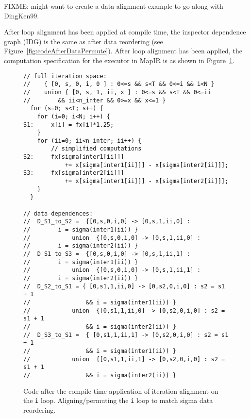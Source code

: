 \documentclass{article}
\begin{document}
FIXME: might want to create a data alignment example to go along with DingKen99.

After loop alignment has been applied at compile time, the inspector dependence graph (IDG) is the same as after data reordering (see Figure~\ref{fig:codeAfterDataPermute}).
After loop alignment has been applied, the computation specification for the executor in MapIR is as shown
in Figure~\ref{fig:codeAfterLA}.

\begin{figure}[h!t!]
\begin{verbatim}
// full iteration space:
//    { [0, s, 0, i, 0 ] : 0<=s && s<T && 0<=i && i<N }
//    union { [0, s, 1, ii, x ] : 0<=s && s<T && 0<=ii 
//        && ii<n_inter && 0>=x && x<=1 }
  for (s=0; s<T; s++) {
    for (i=0; i<N; i++) {
S1:     x[i] = fx[i]*1.25;
    }
    for (ii=0; ii<n_inter; ii++) {
        // simplified computations
S2:     fx[sigma[inter1[ii]]] 
            += x[sigma[inter1[ii]]] - x[sigma[inter2[ii]]]; 
S3:     fx[sigma[inter2[ii]]] 
            += x[sigma[inter1[ii]]] - x[sigma[inter2[ii]]]; 
    }
  }
  
// data dependences:
//  D_S1_to_S2 =  {[0,s,0,i,0] -> [0,s,1,ii,0] : 
//        i = sigma(inter1(ii)) }
//            union  {[0,s,0,i,0] -> [0,s,1,ii,0] : 
//        i = sigma(inter2(ii)) }
//  D_S1_to_S3 =  {[0,s,0,i,0] -> [0,s,1,ii,1] : 
//        i = sigma(inter1(ii)) }
//            union  {[0,s,0,i,0] -> [0,s,1,ii,1] : 
//        i = sigma(inter2(ii)) }
//  D_S2_to_S1 = { [0,s1,1,ii,0] -> [0,s2,0,i,0] : s2 = s1 + 1 
//                && i = sigma(inter1(ii)) }
//            union  {[0,s1,1,ii,0] -> [0,s2,0,i,0] : s2 = s1 + 1 
//                && i = sigma(inter2(ii)) }
//  D_S3_to_S1 =  { [0,s1,1,ii,1] -> [0,s2,0,i,0] : s2 = s1 + 1 
//                && i = sigma(inter1(ii)) }
//            union  {[0,s1,1,ii,1] -> [0,s2,0,i,0] : s2 = s1 + 1 
//                && i = sigma(inter2(ii)) }

\end{verbatim}
\caption{Code after the compile-time application of iteration alignment on the
{\tt i} loop.  Aligning/permuting the {\tt i} loop to match sigma data reordering.}
\label{fig:codeAfterLA}
\end{figure}





\end{document}
